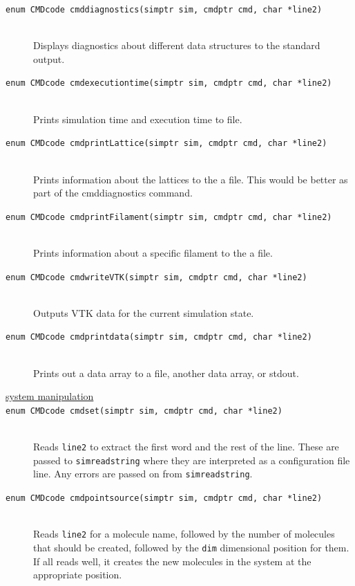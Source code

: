 \documentclass {scrbook}
\newcommand {\ttt} {\texttt}
\begin{document}
\begin{description}
\item[\ttt{enum CMDcode cmddiagnostics(simptr sim, cmdptr cmd, char *line2)}]
\hfill \\
Displays diagnostics about different data structures to the standard output.

\item[\ttt{enum CMDcode cmdexecutiontime(simptr sim, cmdptr cmd, char *line2)}]
\hfill \\
Prints simulation time and execution time to file.

\item[\ttt{enum CMDcode cmdprintLattice(simptr sim, cmdptr cmd, char *line2)}]
\hfill \\
Prints information about the lattices to the a file. This would be better as part of the cmddiagnostics command.

\item[\ttt{enum CMDcode cmdprintFilament(simptr sim, cmdptr cmd, char *line2)}]
\hfill \\
Prints information about a specific filament to the a file.

\item[\ttt{enum CMDcode cmdwriteVTK(simptr sim, cmdptr cmd, char *line2)}]
\hfill \\
Outputs VTK data for the current simulation state.

\item[\ttt{enum CMDcode cmdprintdata(simptr sim, cmdptr cmd, char *line2)}]
\hfill \\
Prints out a data array to a file, another data array, or stdout.

\item[\underline{system manipulation}]

\item[\ttt{enum CMDcode cmdset(simptr sim, cmdptr cmd, char *line2)}]
\hfill \\
Reads \ttt{line2} to extract the first word and the rest of the line. These are passed to \ttt{simreadstring} where they are interpreted as a configuration file line. Any errors are passed on from \ttt{simreadstring}.

\item[\ttt{enum CMDcode cmdpointsource(simptr sim, cmdptr cmd, char *line2)}]
\hfill \\
Reads \ttt{line2} for a molecule name, followed by the number of molecules that should be created, followed by the \ttt{dim} dimensional position for them. If all reads well, it creates the new molecules in the system at the appropriate position.


\end{description}
\end{document}
